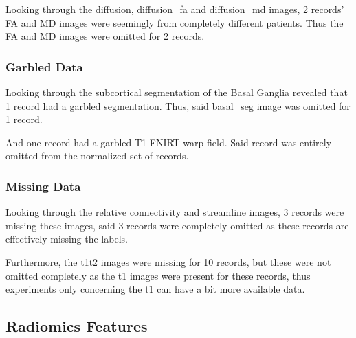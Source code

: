 Looking through the diffusion, diffusion\_fa and diffusion\_md images, 2 records' \ac{FA} and \ac{MD} images were seemingly from completely different patients. Thus the \ac{FA} and \ac{MD} images were omitted for 2 records.

\subsubsection{Garbled Data}

Looking through the subcortical segmentation of the Basal Ganglia revealed that 1 record had a garbled segmentation. Thus, said basal\_seg image was omitted for 1 record.\par
And one record had a garbled T1 \ac{FNIRT} warp field. Said record was entirely omitted from the normalized set of records.

\subsubsection{Missing Data}

Looking through the relative connectivity and streamline images, 3 records were missing these images, said 3 records were completely omitted as these records are effectively missing the labels.\par
Furthermore, the t1t2 images were missing for 10 records, but these were not omitted completely as the t1 images were present for these records, thus experiments only concerning the t1 can have a bit more available data.

\subsection{Radiomics Features}

